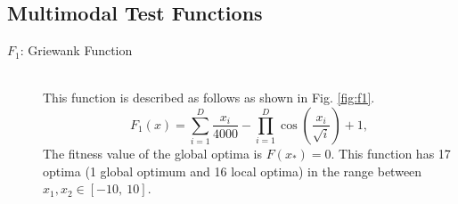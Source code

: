 \subsection{Multimodal Test Functions}
\begin{description}
\item[$F_1$: Griewank Function]\mbox{}\\
This function is described as follows as shown in Fig. \ref{fig:f1}.
\begin{equation}
F_1(x)= \sum_{i=1}^D \frac{x_{i}}{4000} - \prod_{i=1}^D \cos(\frac{x_i}{\sqrt{i}}) + 1,
\label{eq:f1}
\end{equation}
The fitness value of the global optima is ${F(x_*)}=0$. This function has 17 optima (1 global optimum and 16 local optima) in the range between $x_1, x_2 \in [-10, \ 10]$.

\begin{figure}[h]
\centering
{}


\end{figure}
\end{description}

